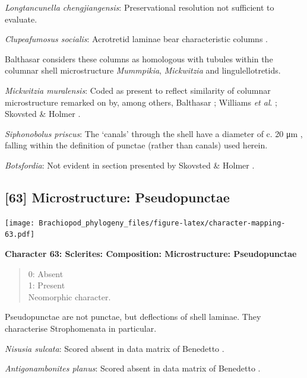 \documentclass[openany]{book}
\theoremstyle{definition}
\theoremstyle{definition}
\theoremstyle{definition}
\theoremstyle{remark}
\begin{document}
\emph{Longtancunella chengjiangensis}: Preservational resolution not
sufficient to evaluate.

\emph{Clupeafumosus socialis}: Acrotretid laminae bear characteristic
columns \citep[e.g.][]{Zhang2016Epithelialcell}.

Balthasar \citeyearpar{Balthasar2008iMummpikia} considers these columns
as homologous with tubules within the columnar shell microstructure
\emph{Mummpikia}, \emph{Mickwitzia} and lingulellotretids.

\emph{Mickwitzia muralensis}: Coded as present to reflect similarity of
columnar microstructure remarked on by, among others, Balthasar
\citeyearpar{Balthasar2008iMummpikia}; Williams \emph{et al}.
\citeyearpar{Williams2007PartH}; Skovsted \& Holmer
\citeyearpar{Skovsted2003EarlyCambrian}.

\emph{Siphonobolus priscus}: The `canals' through the shell have a
diameter of c. 20 μm \citep[text-fig. 2a]{Williams2004Chemicostructure},
falling within the definition of punctae (rather than canals) used
herein.

\emph{Botsfordia}: Not evident in section presented by Skovsted \&
Holmer \citeyearpar{Skovsted2003EarlyCambrian}.

\hypertarget{microstructure-pseudopunctae}{%
\subsection*{{[}63{]} Microstructure:
Pseudopunctae}\label{microstructure-pseudopunctae}}

\texttt{[image: Brachiopod\_phylogeny\_files/figure-latex/character-mapping-63.pdf]}

\textbf{Character 63: Sclerites: Composition: Microstructure:
Pseudopunctae}

\begin{quote}
0: Absent\\
1: Present\\
Neomorphic character.
\end{quote}

Pseudopunctae are not punctae, but deflections of shell laminae. They
characterise Strophomenata in particular.

\emph{Nisusia sulcata}: Scored absent in data matrix of Benedetto
\citeyearpar{Benedetto2009iChaniella}.

\emph{Antigonambonites planus}: Scored absent in data matrix of
Benedetto \citeyearpar{Benedetto2009iChaniella}.
\end{document}
